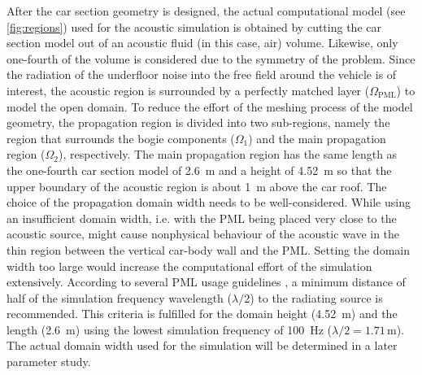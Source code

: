 After the car section geometry is designed, the actual computational model (see \cref{fig:regions}) used for the acoustic simulation is obtained by cutting the car section model out of an acoustic fluid (in this case, air) volume. Likewise, only one-fourth of the volume is considered due to the symmetry of the problem. Since the radiation of the underfloor noise into the free field around the vehicle is of interest, the acoustic region is surrounded by a perfectly matched layer ($\Omega_{\text{PML}}$) to model the open domain. To reduce the effort of the meshing process of the model geometry, the propagation region is divided into two sub-regions, namely the region that surrounds the bogie components ($\Omega_1$) and the main propagation region ($\Omega_2$), respectively. The main propagation region has the same length as the one-fourth car section model of \SI{2.6}{\meter} and a height of \SI{4.52}{\meter} so that the upper boundary of the acoustic region is about \SI{1}{\meter} above the car roof. The choice of the propagation domain width needs to be well-considered. While using an insufficient domain width, i.e. with the PML being placed very close to the acoustic source, might cause nonphysical behaviour of the acoustic wave in the thin region between the vertical car-body wall and the PML. Setting the domain width too large would increase the computational effort of the simulation extensively. According to several PML usage guidelines \cite{PML_comsol, PML_quickwave, PML_3ds}, a minimum distance of half of the simulation frequency wavelength ($\lambda/2$) to the radiating source is recommended. This criteria is fulfilled for the domain height (\SI{4.52}{\meter}) and the length (\SI{2.6}{\meter}) using the lowest simulation frequency of \SI{100}{\hertz} ($\lambda / 2 = 1.71\,\text{m}$). The actual domain width used for the simulation will be determined in a later parameter study.

